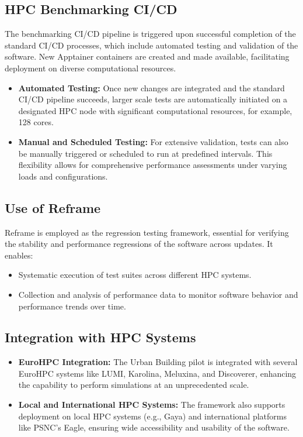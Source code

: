 \subsection{HPC Benchmarking CI/CD}
The benchmarking CI/CD pipeline is triggered upon successful completion of the standard CI/CD processes, which include automated testing and validation of the software. New Apptainer containers are created and made available, facilitating deployment on diverse computational resources.

\begin{itemize}
    \item \textbf{Automated Testing:} Once new changes are integrated and the standard CI/CD pipeline succeeds, larger scale tests are automatically initiated on a designated HPC node with significant computational resources, for example, 128 cores.
    \item \textbf{Manual and Scheduled Testing:} For extensive validation, tests can also be manually triggered or scheduled to run at predefined intervals. This flexibility allows for comprehensive performance assessments under varying loads and configurations.
\end{itemize}

\subsection{Use of Reframe}
Reframe is employed as the regression testing framework, essential for verifying the stability and performance regressions of the software across updates. It enables:
\begin{itemize}
    \item Systematic execution of test suites across different HPC systems.
    \item Collection and analysis of performance data to monitor software behavior and performance trends over time.
\end{itemize}

\subsection{Integration with HPC Systems}
\begin{itemize}
    \item \textbf{EuroHPC Integration:} The Urban Building pilot is integrated with several EuroHPC systems like LUMI, Karolina, Meluxina, and Discoverer, enhancing the capability to perform simulations at an unprecedented scale.
    \item \textbf{Local and International HPC Systems:} The framework also supports deployment on local HPC systems (e.g., Gaya) and international platforms like PSNC's Eagle, ensuring wide accessibility and usability of the software.
\end{itemize}

